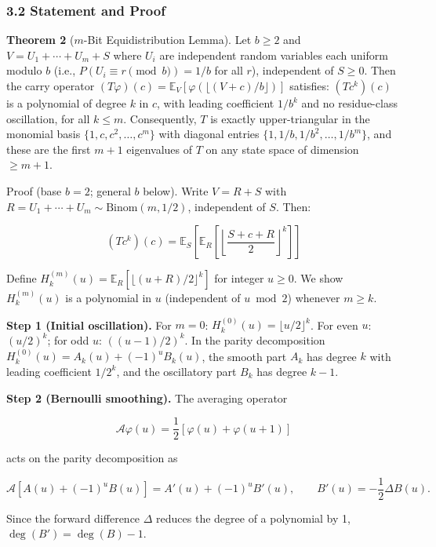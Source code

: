 \documentclass[
  11pt,
]{article}
\begin{document}
\subsubsection{3.2 Statement and Proof}\label{statement-and-proof}

\textbf{Theorem 2} (\(m\)-Bit Equidistribution Lemma). Let \(b \geq 2\) and
\(V = U_1 + \cdots + U_m + S\) where \(U_i\) are independent random variables
each uniform modulo \(b\) (i.e., \(P(U_i \equiv r \pmod{b}) = 1/b\) for all
\(r\)), independent of \(S \geq 0\). Then the carry operator
\((T\varphi)(c) = \mathbb{E}_V[\varphi(\lfloor(V+c)/b\rfloor)]\) satisfies:
\((Tc^k)(c)\) is a polynomial of degree \(k\) in \(c\), with leading coefficient
\(1/b^k\) and no residue-class oscillation, for all \(k \leq m\). Consequently,
\(T\) is exactly upper-triangular in the monomial basis
\(\lbrace{}1, c, c^2, \ldots, c^m\rbrace{}\) with diagonal entries
\(\lbrace{}1, 1/b, 1/b^2, \ldots, 1/b^m\rbrace{}\), and these are the first
\(m+1\) eigenvalues of \(T\) on any state space of dimension \(\geq m+1\).

Proof (base \(b = 2\); general \(b\) below). Write \(V = R + S\) with
\(R = U_1 + \cdots + U_m \sim \text{Binom}(m, 1/2)\), independent of \(S\).
Then:

\[(Tc^k)(c) = \mathbb{E}_S\!\left[\mathbb{E}_R\!\left[\left\lfloor\frac{S + c + R}{2}\right\rfloor^{\!k}\right]\right]\]

Define \(H_k^{(m)}(u) = \mathbb{E}_R[\lfloor(u+R)/2\rfloor^k]\) for integer
\(u \geq 0\). We show \(H_k^{(m)}(u)\) is a polynomial in \(u\) (independent of
\(u \bmod 2\)) whenever \(m \geq k\).

\textbf{Step 1 (Initial oscillation).} For \(m = 0\):
\(H_k^{(0)}(u) = \lfloor u/2 \rfloor^k\). For even \(u\): \((u/2)^k\); for odd
\(u\): \(((u-1)/2)^k\). In the parity decomposition
\(H_k^{(0)}(u) = A_k(u) + (-1)^u B_k(u)\), the smooth part \(A_k\) has degree
\(k\) with leading coefficient \(1/2^k\), and the oscillatory part \(B_k\) has
degree \(k-1\).

\textbf{Step 2 (Bernoulli smoothing).} The averaging operator

\[\mathcal{A}\varphi(u) = \frac{1}{2}[\varphi(u) + \varphi(u+1)]\]

acts on the parity decomposition as

\[\mathcal{A}[A(u) + (-1)^u B(u)] = A'(u) + (-1)^u B'(u), \qquad B'(u) = -\frac{1}{2}\Delta B(u).\]

Since the forward difference \(\Delta\) reduces the degree of a polynomial by 1,
\(\deg(B') = \deg(B) - 1\).
\end{document}
